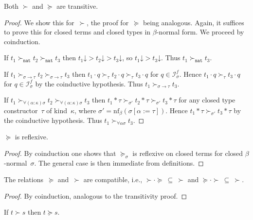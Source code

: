 \documentclass[a4paper,UKenglish,cleveref,autoref,numberwithinsect]{lipics-v2019}
\theoremstyle{definition}
\newcommand{\Iterms}{\mathcal{I}}
\newcommand{\arrtype}{\rightarrow}
\newcommand{\app}[2]{#1 \cdot #2}
\newcommand{\tapp}[2]{#1 * #2}
\newcommand{\subst}[2]{#1:=#2}
\newcommand{\nat}{\mathtt{nat}}
\newcommand{\nf}{\mathrm{nf}}
\newcommand{\da}{\mathord{\downarrow}}
\begin{document}
\begin{lemma}\label{lem_transitive}
  Both $\succ$ and $\succeq$ are transitive.
\end{lemma}

\begin{proof}
  We show this for~$\succ$, the proof for~$\succeq$ being
  analogous. Again, it suffices to prove this for closed terms and
  closed types in $\beta$-normal form. We proceed by coinduction.

  If $t_1 \succ_\nat t_2 \succ_\nat t_3$ then $t_1\da > t_2\da >
  t_3\da$, so $t_1\da > t_3\da$. Thus $t_1 \succ_\nat t_3$.

  If $t_1 \succ_{\sigma\arrtype\tau}t_2\succ_{\sigma\arrtype\tau}t_3$
  then $\app{t_1}{q}\succ_{\tau}\app{t_2}{q}\succ_\tau\app{t_3}{q}$
  for $q \in \Iterms^f_\sigma$. Hence
  $\app{t_1}{q}\succ_\tau\app{t_3}{q}$ for $q \in \Iterms^f_\sigma$ by
  the coinductive hypothesis. Thus $t_1\succ_{\sigma\arrtype\tau}
  t_3$.

  If $t_1
  \succ_{\forall(\alpha:\kappa)\sigma}t_2\succ_{\forall(\alpha:\kappa)\sigma}t_3$
  then
  $\tapp{t_1}{\tau}\succ_{\sigma'}\tapp{t_2}{\tau}\succ_{\sigma'}\tapp{t_3}{\tau}$
  for any closed type constructor~$\tau$ of kind~$\kappa$, where
  $\sigma' = \nf_\beta(\sigma[\subst{\alpha}{\tau}])$. Hence
  $\tapp{t_1}{\tau}\succ_{\sigma'}\tapp{t_3}{\tau}$ by the coinductive
  hypothesis. Thus $t_1\succ_{\forall\alpha\sigma} t_3$.
\end{proof}

\begin{lemma}\label{lem_reflexive}
  $\succeq$ is reflexive.
\end{lemma}

\begin{proof}
  By coinduction one shows that $\succeq_\sigma$ is reflexive on
  closed terms for closed $\beta$-normal~$\sigma$. The general case is
  then immediate from definitions.
\end{proof}

\begin{lemma}\label{lem:compatibility}
  The relations~$\succeq$ and~$\succ$ are compatible, i.e., $\succ
  \cdot \succeq\ \subseteq\ \succ$ and $\succeq \cdot
  \succ\ \subseteq\ \succ$.
\end{lemma}

\begin{proof}
  By coinduction, analogous to the transitivity proof.
\end{proof}

\begin{lemma}\label{lem_succ_to_succeq}
  If $t \succ s$ then $t \succeq s$.
\end{lemma}
\end{document}
